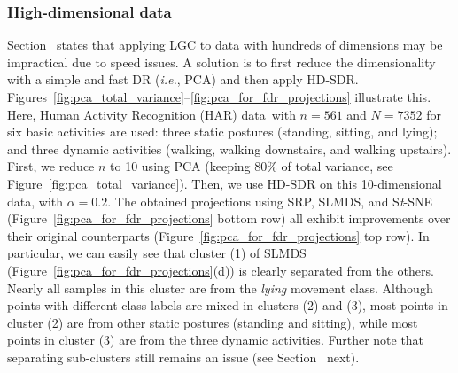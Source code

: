 \documentclass[sagev,Afour,times]{sagej}
\begin{document}
\subsubsection{High-dimensional data}
\label{sec:sub:scalability:speed:highD}
%
Section~ states that applying LGC to data with hundreds of dimensions may be impractical due to speed issues. A solution is to first reduce the dimensionality with a simple and fast DR (\emph{i.e.}, PCA) and then apply HD-SDR. Figures~\ref{fig:pca_total_variance}--\ref{fig:pca_for_fdr_projections} illustrate this. Here, Human Activity Recognition (HAR) data\,\cite{realworld:uciML,realworld:HAR:UCI} with $n=561$ and $N=7352$ for six basic activities are used: three static postures (standing, sitting, and lying); and three dynamic activities (walking, walking downstairs, and walking upstairs). First, we reduce $n$ to 10 using PCA (keeping 80\% of total variance, see Figure~\ref{fig:pca_total_variance}). Then, we use HD-SDR on this 10-dimensional data, with $\alpha=0.2$. The obtained projections using SRP, SLMDS, and S\emph{t}-SNE (Figure~\ref{fig:pca_for_fdr_projections} bottom row) all exhibit improvements over their original counterparts (Figure~\ref{fig:pca_for_fdr_projections} top row). In particular, we can easily see that cluster (1) of SLMDS (Figure~\ref{fig:pca_for_fdr_projections}(d)) is clearly separated from the others. Nearly all samples in this cluster are from the \emph{lying} movement class. Although points with different class labels are mixed in clusters (2) and (3), most points in cluster (2) are from other static postures (standing and sitting), while most points in cluster (3) are from the three dynamic activities. Further note that separating sub-clusters still remains an issue (see Section~ next).

\end{document}
